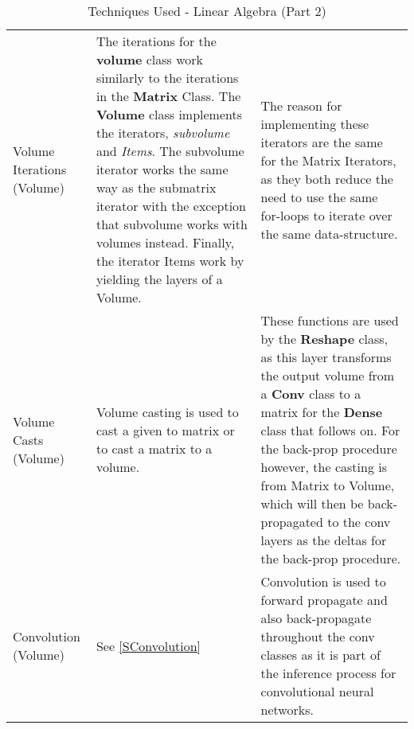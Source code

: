 \begin{table}[H]
    \centering
    \begin{tabular}{|p{2.2cm}|p{6cm}|p{7cm}|}
    \hline
    Volume Iterations (Volume) & The iterations for the \textbf{volume} class work similarly to the iterations in the \textbf{Matrix} Class. The \textbf{Volume} class implements the iterators, \textit{subvolume} and \textit{Items}. The subvolume iterator works the same way as the submatrix iterator with the exception that subvolume works with volumes instead. Finally, the iterator Items work by yielding the layers of a Volume.
    & The reason for implementing these iterators are the same for the Matrix Iterators, as they both reduce the need to use the same for-loops to iterate over the same data-structure. \\ \cline{1-3}
    
    Volume Casts (Volume) & Volume casting is used to cast a given to matrix or to cast a matrix to a volume. & These functions are used by the \textbf{Reshape} class, as this layer transforms the output volume from a \textbf{Conv} class to a matrix for the \textbf{Dense} class that follows on. For the back-prop procedure however, the casting is from Matrix to Volume, which will then be back-propagated to the conv layers as the deltas for the back-prop procedure. \\ \cline{1-3}
    
    Convolution (Volume) & See \ref{SConvolution} & Convolution is used to forward propagate and also back-propagate throughout the conv classes as it is part of the inference process for convolutional neural networks. \\ \cline{1-3}
    \end{tabular}
    \caption{Techniques Used - Linear Algebra (Part 2) }
\end{table}


